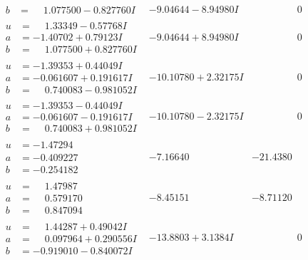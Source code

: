 \documentclass[1p]{elsarticle_modified}
\theoremstyle{definition}
\begin{document}
$$\begin{array}{c|c|c}
\begin{aligned}
b &= \phantom{-}1.077500 - 0.827760 I\end{aligned}
 & -9.04644 - 8.94980 I & \phantom{-0.000000 } 0 \\ \hline\begin{aligned}
u &= \phantom{-}1.33349 - 0.57768 I \\
a &= -1.40702 + 0.79123 I \\
b &= \phantom{-}1.077500 + 0.827760 I\end{aligned}
 & -9.04644 + 8.94980 I & \phantom{-0.000000 } 0 \\ \hline\begin{aligned}
u &= -1.39353 + 0.44049 I \\
a &= -0.061607 + 0.191617 I \\
b &= \phantom{-}0.740083 - 0.981052 I\end{aligned}
 & -10.10780 + 2.32175 I & \phantom{-0.000000 } 0 \\ \hline\begin{aligned}
u &= -1.39353 - 0.44049 I \\
a &= -0.061607 - 0.191617 I \\
b &= \phantom{-}0.740083 + 0.981052 I\end{aligned}
 & -10.10780 - 2.32175 I & \phantom{-0.000000 } 0 \\ \hline\begin{aligned}
u &= -1.47294\phantom{ +0.000000I} \\
a &= -0.409227\phantom{ +0.000000I} \\
b &= -0.254182\phantom{ +0.000000I}\end{aligned}
 & -7.16640\phantom{ +0.000000I} & -21.4380\phantom{ +0.000000I} \\ \hline\begin{aligned}
u &= \phantom{-}1.47987\phantom{ +0.000000I} \\
a &= \phantom{-}0.579170\phantom{ +0.000000I} \\
b &= \phantom{-}0.847094\phantom{ +0.000000I}\end{aligned}
 & -8.45151\phantom{ +0.000000I} & -8.71120\phantom{ +0.000000I} \\ \hline\begin{aligned}
u &= \phantom{-}1.44287 + 0.49042 I \\
a &= \phantom{-}0.097964 + 0.290556 I \\
b &= -0.919010 - 0.840072 I\end{aligned}
 & -13.8803 + 3.1384 I & \phantom{-0.000000 } 0 \\ \hline\begin{aligned}

\end{aligned}
\end{array}$$
\end{document}
